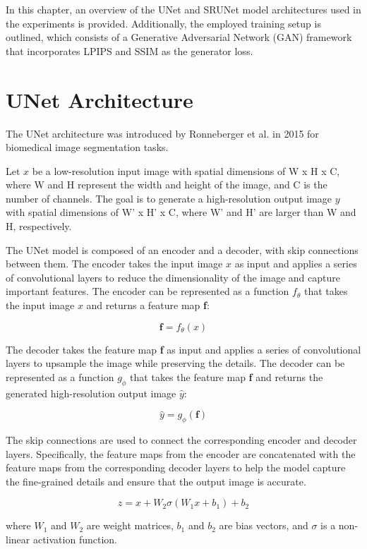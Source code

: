 \label{chap:Architectures}

In this chapter, an overview of the UNet and SRUNet model architectures used in the experiments is provided. Additionally, the employed training setup is outlined, which consists of a Generative Adversarial Network (GAN) framework that incorporates LPIPS and SSIM as the generator loss.

\section{UNet Architecture}
\label{sec:unet}

The UNet architecture was introduced by Ronneberger et al. \cite{ronneberger2015u} in 2015 for biomedical image segmentation tasks.

Let $x$ be a low-resolution input image with spatial dimensions of W x H x C, where W and H represent the width and height of the image, and C is the number of channels. The goal is to generate a high-resolution output image $y$ with spatial dimensions of W' x H' x C, where W' and H' are larger than W and H, respectively.

The UNet model is composed of an encoder and a decoder, with skip connections between them. The encoder takes the input image $x$ as input and applies a series of convolutional layers to reduce the dimensionality of the image and capture important features. The encoder can be represented as a function $f_\theta$ that takes the input image $x$ and returns a feature map \textbf{f}:

$$ \textbf{f} = f_\theta(x) $$

The decoder takes the feature map \textbf{f} as input and applies a series of convolutional layers to upsample the image while preserving the details. The decoder can be represented as a function $g_\phi$ that takes the feature map \textbf{f} and returns the generated high-resolution output image $\hat{y}$:

$$ \hat{y} = g_\phi(\textbf{f}) $$

The skip connections are used to connect the corresponding encoder and decoder layers. Specifically, the feature maps from the encoder are concatenated with the feature maps from the corresponding decoder layers to help the model capture the fine-grained details and ensure that the output image is accurate.

$$ z = x + W_2\sigma(W_1 x + b_1) + b_2 $$

where $W_1$ and $W_2$ are weight matrices, $b_1$ and $b_2$ are bias vectors, and $\sigma$ is a non-linear activation function.

